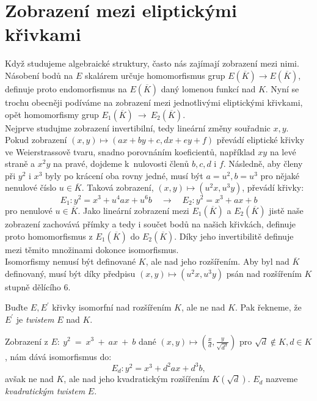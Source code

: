 \documentclass [12pt]{report}
\begin{document}
\section{Zobrazení mezi eliptickými křivkami}

Když studujeme algebraické struktury, často nás zajímají zobrazení mezi nimi. Násobení bodů na $E$ skalárem určuje homomorfismus grup $E(\overline{K}) \longrightarrow E(\overline{K})$, definuje proto endomorfismus na $E(\overline{K})$ daný lomenou funkcí nad $K$. Nyní se trochu obecněji podíváme na zobrazení mezi jednotlivými eliptickými křivkami, opět homomorfismy grup $E_1(\overline{K})~\longrightarrow~E_2(\overline{K})$.\\

Nejprve studujme zobrazení invertibilní, tedy lineární změny souřadnic $x,y$. Pokud zobrazení $(x,y) \mapsto (ax+by+c,dx+ey+f)$ převádí eliptické křivky ve Weierstrassově tvaru, snadno porovnáním koeficientů, například $xy$ na levé straně a $x^2 y$ na pravé, dojdeme k~nulovosti členů $b,c,d$ i $f$. Následně, aby členy při $y^2$ i $x^3$ byly po krácení oba rovny jedné, musí být $a = u^2, b = u^3$ pro nějaké nenulové číslo $u \in \overline{K}$. Taková zobrazení, $(x,y) \mapsto (u^2 x, u^3 y)$, převádí křivky:
\begin{equation*}
E_1 : y^2 = x^3 + u^4 a x + u^6 b \quad \longrightarrow \quad E_2 :  y^2 = x^3 + ax + b 
\end{equation*}
pro nenulové $u \in \overline{K}$. Jako lineární zobrazení mezi $E_1(\overline{K})$ a $E_2(\overline{K})$ jistě naše zobrazení zachovává přímky a tedy i součet bodů na našich křivkách, definuje proto homomorfismus z $E_1(\overline{K})$ do $E_2(\overline{K})$. Díky jeho invertibilitě definuje mezi těmito množinami dokonce isomorfismus.\\

Isomorfismy nemusí být definované $K$, ale nad jeho rozšířením. Aby byl nad $\overline{K}$ definovaný, musí být díky předpisu $(x,y) \mapsto (u^2 x, u^3 y)$ psán nad rozšířením $K$ stupně dělícího $6$.
\begin{definice}
Buďte $E,E^\prime$ křivky isomorfní nad rozšířením $K$, ale ne nad $K$. Pak řekneme, že $E^\prime$ je \textit{twistem} $E$ nad $K$.
\end{definice}
Zobrazení z  $E:~y^2~=~x^3~+~ax~+~b$ dané $(x,y) \mapsto \left(\frac{x}{d}, \frac{y}{\sqrt{d^3}}\right) $ pro $\sqrt{d} \not \in K, d \in K$, nám dává isomorfismus do:
\begin{equation*}
E_d : y^2 = x^3 + d^2 a x + d^3 b,
\end{equation*}
avšak ne nad $K$, ale nad jeho kvadratickým rozšířením $K(\sqrt{d})$. $E_d$ nazveme \textit{kvadratickým twistem} $E$.\\
\end{document}

